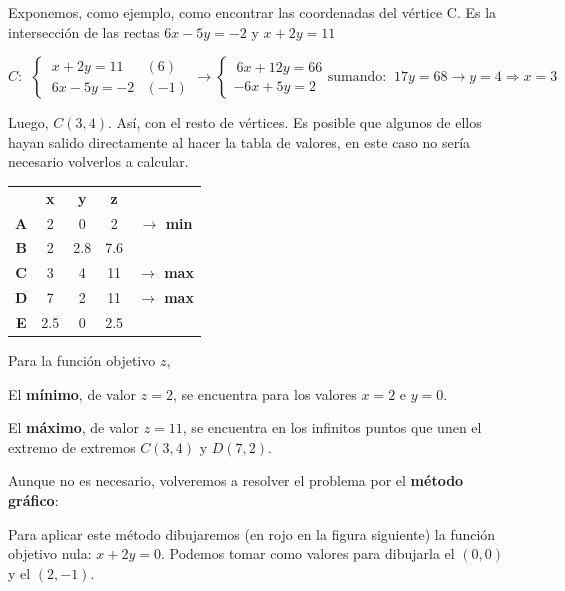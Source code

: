 Exponemos, como ejemplo, como encontrar las coordenadas del vértice C. Es la intersección de las rectas $6x-5y=-2$ y $x+2y=11$


\vspace{2mm}
$C:\ \ \begin{cases}
 \ x+2y=11 & (6)\\ \ 6x-5y=-2 &(-1)	
 \end{cases} 
 \to 
 \begin{cases}
 \ 6x+12y=66 \\ -6x+5y=2 
 \end{cases}
 \text{sumando: } \ 17y=68 \to y=4 \Rightarrow x=3 
 $
 
 Luego, $C(3,4)$. Así, con el resto de vértices. Es posible que algunos de ellos hayan salido directamente al hacer la tabla de valores, en este caso no sería necesario volverlos a calcular.
 

\begin{multicols}{2}
\begin{table}[H]
\centering
\begin{tabular}{cc|c|cc}
 & \textbf{x} & \textbf{y} & \textbf{z} & \textbf{} \\ \cline{2-4}
\textbf{A} & 2 & 0 & 2 & \textbf{$\to $ min} \\
\textbf{B} & 2 & 2.8 & 7.6 &  \\
\textbf{C} & 3 & 4 & 11 & \textbf{$\to $ max} \\
\textbf{D} & 7 & 2 & 11 & \textbf{$\to $ max} \\
\textbf{E} & 2.5 & 0 & 2.5 & 
\end{tabular}
\end{table}

\begin{destacado}
Para la función objetivo $z$,

El \textbf{mínimo}, de valor $z=2$, se encuentra para los valores $x=2$ e $y=0$.

El \textbf{máximo}, de valor $z=11$, se encuentra en los infinitos puntos que unen el extremo de extremos $C(3,4)$ y $D(7,2)$.
\end{destacado}
\end{multicols}

Aunque no es necesario, volveremos a resolver el problema por el \textbf{método gráfico}:

Para aplicar este método dibujaremos (en rojo en la figura siguiente) la función objetivo nula: $x+2y=0$. Podemos tomar como valores para dibujarla el $(0,0)$ y el $(2,-1)$.

